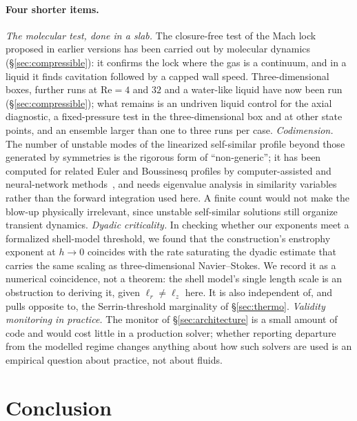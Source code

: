 \documentclass[11pt,a4paper]{article}
\begin{document}
\paragraph{Four shorter items.} \emph{The molecular test, done in a slab.} The closure-free test of the Mach
lock proposed in earlier versions has been carried out by molecular dynamics (\S\ref{sec:compressible}): it
confirms the lock where the gas is a continuum, and in a liquid it finds cavitation followed by a capped wall
speed. Three-dimensional boxes, further runs at $\mathrm{Re}=4$ and $32$ and a water-like liquid have now been run
(\S\ref{sec:compressible}); what remains is an undriven liquid control for the axial diagnostic, a fixed-pressure test in the three-dimensional
box and at other state points, and an ensemble larger than one to three runs per case. \emph{Codimension.} The number of unstable modes of the
linearized self-similar profile beyond those generated by symmetries is the rigorous form of
``non-generic''; it has been computed for related Euler and Boussinesq profiles by
computer-assisted and neural-network methods~\cite{ChenHou2022,Wang2025}, and needs eigenvalue
analysis in similarity variables rather than the forward integration used here. A finite count
would not make the blow-up physically irrelevant, since unstable self-similar solutions still
organize transient dynamics. \emph{Dyadic criticality.} In checking whether our exponents meet a
formalized shell-model threshold, we found that the construction's enstrophy exponent at $h\to0$
coincides with the rate saturating the dyadic estimate that carries the same scaling as
three-dimensional Navier--Stokes. We record it as a numerical coincidence, not a theorem: the shell
model's single length scale is an obstruction to deriving it, given $\ell_r\neq\ell_z$ here. It is
also independent of, and pulls opposite to, the Serrin-threshold marginality of \S\ref{sec:thermo}.
\emph{Validity monitoring in practice.} The monitor of \S\ref{sec:architecture} is a small amount
of code and would cost little in a production solver; whether reporting departure from the modelled
regime changes anything about how such solvers are used is an empirical question about practice,
not about fluids.

\section{Conclusion}
\end{document}

